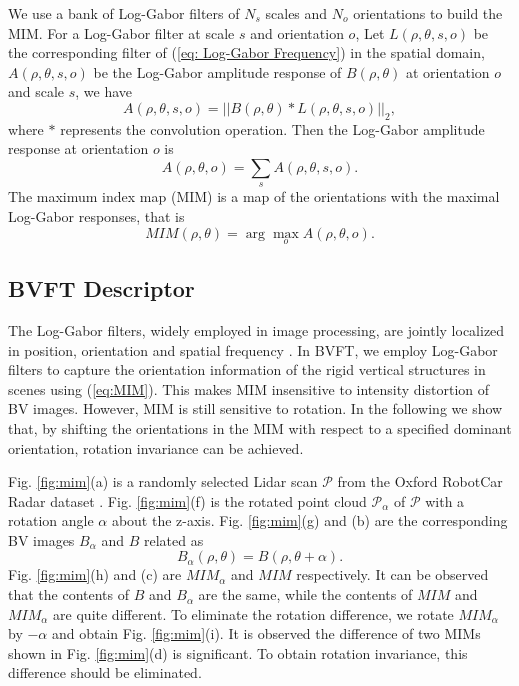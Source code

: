 \documentclass[letterpaper, 10 pt, journal, twoside]{IEEEtran}
\begin{document}
We use a bank of Log-Gabor filters of $N_s$ scales and $N_o$ orientations to build the MIM. For a Log-Gabor filter at scale $s$ and orientation $o$,   Let  $L(\rho,\theta,s,o)$ be the corresponding filter of (\ref{eq: Log-Gabor Frequency}) in the spatial domain, $A(\rho,\theta,s,o)$ be the Log-Gabor amplitude response of $B(\rho,\theta)$ at orientation $o$ and scale $s$, we have
\begin{equation}
        \label{eq: magnitude response}
        A(\rho,\theta,s,o)=||B(\rho,\theta)* L(\rho,\theta,s,o)||_2,
\end{equation}
where $*$ represents the convolution operation. Then the Log-Gabor amplitude response at orientation $o$ is
\begin{equation}
        \label{eq: orientation response}
A (\rho,\theta,o)=\sum_s A(\rho,\theta,s,o).
\end{equation}
The maximum index map (MIM) is a map of the orientations with the maximal Log-Gabor responses,  that is
\begin{equation}
        \label{eq:MIM}
MIM (\rho,\theta)=\arg\max_o A (\rho,\theta,o).
\end{equation}



\subsection{BVFT Descriptor} 
The Log-Gabor filters, widely employed in image processing, are jointly localized in position, orientation and spatial frequency \cite{fischer2007self}. In BVFT, we employ Log-Gabor filters to capture the orientation information of the rigid vertical structures in scenes using (\ref{eq:MIM}). This makes MIM insensitive to intensity distortion of BV images. However, MIM is still sensitive to rotation. In the following we show that, by shifting the orientations in the MIM with respect to a specified dominant orientation, rotation invariance can be achieved.

Fig. \ref{fig:mim}(a) is a randomly selected Lidar scan $\mathcal{P}$ from the Oxford RobotCar Radar dataset \cite{barnes2020oxford}. Fig. \ref{fig:mim}(f) is the rotated point cloud $\mathcal{P}_\alpha$ of $\mathcal{P}$ with a rotation angle $\alpha$ about the z-axis. Fig. \ref{fig:mim}(g) and (b) are the corresponding BV images $B_\alpha$ and $B$ related as 
\begin{equation}
        \label{eq: BV relation}
        B_\alpha(\rho,\theta) = B(\rho,\theta+\alpha).
\end{equation}
Fig. \ref{fig:mim}(h) and (c) are $MIM_\alpha$ and $MIM$ respectively. It can be observed that the contents of $B$ and $B_\alpha$ are the same, while the contents of $MIM$ and $MIM_\alpha$ are quite different. To eliminate the rotation difference, we rotate $MIM_\alpha$ by $-\alpha$ and obtain Fig. \ref{fig:mim}(i). It is observed the difference of two MIMs shown in Fig. \ref{fig:mim}(d) is significant. To obtain rotation invariance, this difference should be eliminated.
\end{document}
